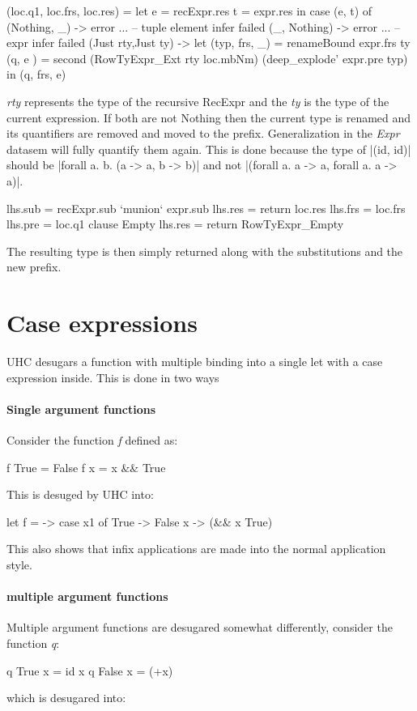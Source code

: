 \begin{code}    
   (loc.q1, loc.frs, loc.res)
     =  let  e  = recExpr.res
             t  = expr.res
        in case (e, t) of
             (Nothing, _) -> error ... -- tuple element infer failed
             (_, Nothing) -> error ... -- expr infer failed
             (Just rty,Just ty) -> 
                let  (typ, frs,  _)  = renameBound expr.frs ty 
                     (q,   e      )  = second  (RowTyExpr_Ext rty loc.mbNm) 
                                               (deep_explode' expr.pre typ)
                in (q, frs, e)
\end{code}
\emph{rty} represents the type of the recursive RecExpr and the \emph{ty} is the type of the current expression. If both are not Nothing then the current type is renamed and its quantifiers are removed and moved to the prefix. Generalization in the \emph{Expr} datasem will fully quantify them again. This is done because the type of |(id, id)| should be |forall a. b. (a -> a, b -> b)| and not |(forall a. a -> a, forall a. a -> a)|.

\begin{code}                              
      lhs.sub  = recExpr.sub `munion` expr.sub
      lhs.res  = return loc.res
      lhs.frs  = loc.frs
      lhs.pre  = loc.q1
   clause Empty
      lhs.res  = return RowTyExpr_Empty
\end{code}
The resulting type is then simply returned along with the substitutions and the new prefix. 

\section{Case expressions}
UHC desugars a function with multiple binding into a single let with a case expression inside. This is done in two ways
\paragraph{Single argument functions}
Consider the function \emph{f} defined as:
\begin{code}
f True  = False
f x     = x && True
\end{code}
This is desuged by UHC into:
\begin{code}
let f =  -> case x1 of
                 True -> False
                 x -> (&& x True)
\end{code}
This also shows that infix applications are made into the normal application style.

\paragraph{multiple argument functions}
Multiple argument functions are desugared somewhat differently, consider the function \emph{q}:
\begin{code}
q True  x = id x
q False x = (+x)
\end{code}
which is desugared into:


